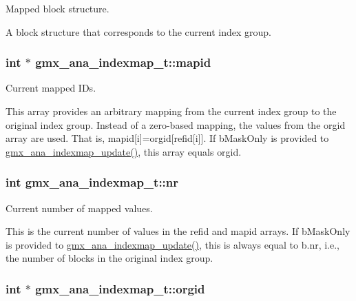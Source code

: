 \-Mapped block structure. 

\-A block structure that corresponds to the current index group. \hypertarget{structgmx__ana__indexmap__t_a786679766d4c1bcd5261be047660d236}{
\subsubsection[{mapid}]{\setlength{\rightskip}{0pt plus 5cm}int $\ast$ {\bf gmx\-\_\-ana\-\_\-indexmap\-\_\-t\-::mapid}}}\label{structgmx__ana__indexmap__t_a786679766d4c1bcd5261be047660d236}


\-Current mapped \-I\-Ds. 

\-This array provides an arbitrary mapping from the current index group to the original index group. \-Instead of a zero-\/based mapping, the values from the {\ttfamily orgid} array are used. \-That is, {\ttfamily mapid}\mbox{[}i\mbox{]}=orgid\mbox{[}refid\mbox{[}i\mbox{]}\mbox{]}. \-If {\ttfamily b\-Mask\-Only} is provided to \hyperlink{include_2indexutil_8h_aeca832c56e9b3f19a049d65aff18cd69}{gmx\-\_\-ana\-\_\-indexmap\-\_\-update()}, this array equals {\ttfamily orgid}. \hypertarget{structgmx__ana__indexmap__t_a23442a6a8b1fee0aaef41f5a7e69d676}{
\subsubsection[{nr}]{\setlength{\rightskip}{0pt plus 5cm}int {\bf gmx\-\_\-ana\-\_\-indexmap\-\_\-t\-::nr}}}\label{structgmx__ana__indexmap__t_a23442a6a8b1fee0aaef41f5a7e69d676}


\-Current number of mapped values. 

\-This is the current number of values in the {\ttfamily refid} and {\ttfamily mapid} arrays. \-If {\ttfamily b\-Mask\-Only} is provided to \hyperlink{include_2indexutil_8h_aeca832c56e9b3f19a049d65aff18cd69}{gmx\-\_\-ana\-\_\-indexmap\-\_\-update()}, this is always equal to {\ttfamily b.\-nr}, i.\-e., the number of blocks in the original index group. \hypertarget{structgmx__ana__indexmap__t_ad062bcdfae92123a664d4db636d9f1b1}{
\subsubsection[{orgid}]{\setlength{\rightskip}{0pt plus 5cm}int $\ast$ {\bf gmx\-\_\-ana\-\_\-indexmap\-\_\-t\-::orgid}}}\label{structgmx__ana__indexmap__t_ad062bcdfae92123a664d4db636d9f1b1}


